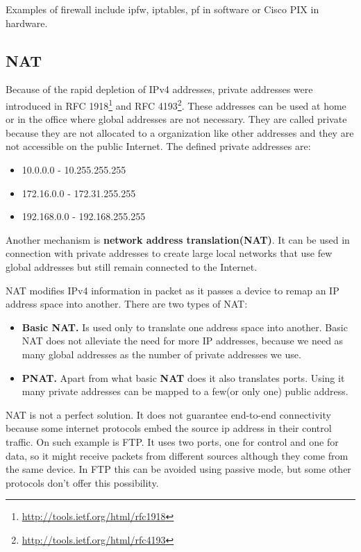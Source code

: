 Examples of firewall include ipfw, iptables, pf in software or Cisco PIX in hardware.


\subsection{NAT}
\label{sub-sec:nat}

Because of the rapid depletion of IPv4 addresses, private addresses were introduced in 
RFC 1918\footnote{\url{http://tools.ietf.org/html/rfc1918}} and RFC 4193\footnote{\url{http://tools.ietf.org/html/rfc4193}}. 
These addresses can be used at home or in the office where global addresses are not necessary. They are called 
private because they are not allocated to a organization like other addresses and they are not accessible on the 
public Internet. The defined private addresses are:
\begin{itemize}
  \item 10.0.0.0 - 10.255.255.255
  \item 172.16.0.0 - 172.31.255.255
  \item 192.168.0.0 - 192.168.255.255
\end{itemize}

Another mechanism is \textbf{network address translation(NAT)}. It can be used in connection with private addresses to create
large local networks that use few global addresses but still remain connected to the Internet. 

NAT modifies IPv4 information in packet as it passes a device to remap an IP address space into another. There are two types of
NAT:
\begin{itemize}
  \item \textbf{Basic NAT.} Is used only to translate one address space into another. Basic NAT does not alleviate the need
for more IP addresses, because we need as many global addresses as the number of private addresses we use.
  \item \textbf{PNAT.} Apart from what basic \textbf{NAT} does it also translates ports. Using it many private addresses can be mapped
to a few(or only one) public address.
\end{itemize}


NAT is not a perfect solution. It does not guarantee end-to-end connectivity because some internet protocols embed the source
ip address in their control traffic. On such example is FTP. It uses two ports, one for control and one for data, so it might receive
packets from different sources although they come from the same device. In FTP this can be avoided using passive mode, but some other 
protocols don't offer this possibility.

